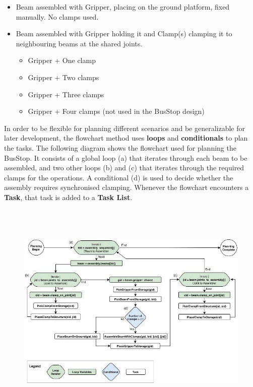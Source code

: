 \documentclass[11pt]{book}
\begin{document}
\begin{itemize}
	\item Beam assembled with Gripper, placing on the ground platform, fixed manually. No clamps used.

	\item Beam assembled with Gripper holding it and Clamp(s) clamping it to neighbouring beams at the shared joints.

\begin{itemize}
	\item Gripper + One clamp

	\item Gripper + Two clamps

	\item Gripper + Three clamps

	\item Gripper + Four clamps (not used in the BusStop design)

\end{itemize}
\end{itemize}
In order to be flexible for planning different scenarios and be generalizable for later development, the flowchart method uses \textbf{loops }and \textbf{conditionals }to plan the tasks. The following diagram shows the flowchart used for planning the BusStop. It consists of a global loop (a) that iterates through each beam to be assembled, and two other loops (b) and (c) that iterates through the required clamps for the operations. A conditional (d) is used to decide whether the assembly requires synchronised clamping. Whenever the flowchart encounters a \textbf{Task}, that task is added to a \textbf{Task List}. 

\begin{figure}[H]
\includegraphics[width=15.92cm,height=10.69cm]{./images/image18.jpeg}
\end{figure}
\end{document}
